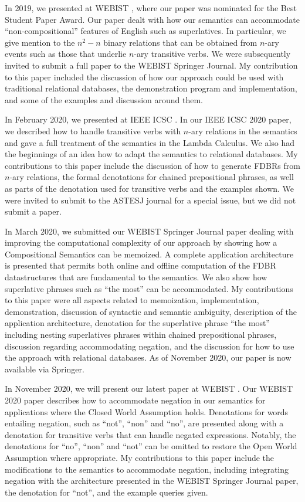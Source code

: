 \documentclass[../main.tex]{subfiles}
\begin{document}
\begin{refsection}
    In 2019, we presented at WEBIST \cite{frostpeelar2019}, where our paper was nominated for the Best Student Paper Award.  Our paper dealt with how our semantics can accommodate ``non-compositional'' features of English such as superlatives.  In particular, we give mention to the $n^2 - n$ binary relations that can be obtained from $n$-ary events such as those that underlie $n$-ary transitive verbs.  We were subsequently invited to submit a full paper to the WEBIST Springer Journal.
    My contribution to this paper included the discussion of how our approach could be used with traditional relational databases, the demonstration program and implementation, and some of the examples and discussion around them.

    In February 2020, we presented at IEEE ICSC \cite{peelar2020compositional}.  In our IEEE ICSC 2020 paper, we described how to handle transitive verbs with $n$-ary relations in the semantics and gave a full treatment of the semantics in the Lambda Calculus.  We also had the beginnings of an idea how to adapt the semantics to relational databases.  My contributions to this paper include the discussion of how to generate FDBRs from $n$-ary relations, the formal denotations for chained prepositional phrases, as well as parts of the denotation used for transitive verbs and the examples shown. We were invited to submit to the ASTESJ journal for a special issue, but we did not submit a paper.

    In March 2020, we submitted our WEBIST Springer Journal \cite{peelar2020webistjournal} paper dealing with improving the computational complexity of our approach by showing how a Compositional Semantics can be memoized.  A complete application architecture is presented that permits both online and offline computation of the FDBR datastructures that are fundamental to the semantics.  We also show how superlative phrases such as ``the most'' can be accommodated.  My contributions to this paper were all aspects related to memoization, implementation, demonstration, discussion of syntactic and semantic ambiguity, description of the application architecture, denotation for the superlative phrase ``the most'' including nesting superlatives phrases within chained prepositional phrases, discussion regarding accommodating negation, and the discussion for how to use the approach with relational databases.  As of November 2020, our paper is now available via Springer.

    In November 2020, we will present our latest paper at WEBIST \cite{peelarfrostwebist2020}.  Our WEBIST 2020 paper describes how to accommodate negation in our semantics for applications where the Closed World Assumption holds.  Denotations for words entailing negation, such as ``not'', ``non'' and ``no'', are presented along with a denotation for transitive verbs that can handle negated expressions.  Notably, the denotations for ``no'', ``non'' and ``not'' can be omitted to restore the Open World Assumption where appropriate.
    My contributions to this paper include the modifications to the semantics to accommodate negation, including integrating negation with the architecture presented in the WEBIST Springer Journal paper, the denotation for ``not'', and the example queries given.


\end{refsection}
\end{document}
